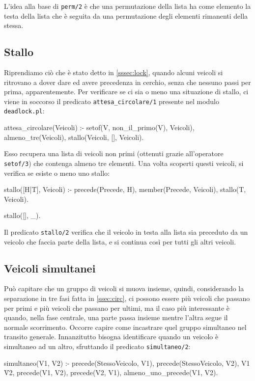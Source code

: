 L'idea alla base di \texttt{perm/2} è che una permutazione della lista ha come elemento la testa della lista che è seguita da una permutazione degli elementi rimanenti della stessa.

\subsection{Stallo}
Riprendiamo ciò che è stato detto in \ref{sssec:lock}, quando alcuni veicoli si ritrovano a dover dare ed avere precedenza in cerchio, senza che nessuno passi per prima, apparentemente. Per verificare se ci sia o meno una situazione di stallo, ci viene in soccorso il predicato \texttt{attesa\_circolare/1} presente nel modulo \texttt{deadlock.pl}:

\begin{verbatimtab}
attesa_circolare(Veicoli) :-
	setof(V, non_il_primo(V), Veicoli),
	almeno_tre(Veicoli),
	stallo(Veicoli, [], Veicoli).
\end{verbatimtab}

Esso recupera una lista di veicoli non primi (ottenuti grazie all'operatore \texttt{setof/3}) che contenga almeno tre elementi. Una volta scoperti questi veicoli, si verifica se esiste o meno uno stallo:
\begin{verbatimtab}
stallo([H|T], Veicoli) :-
	precede(Precede, H),
	member(Precede, Veicoli),
	stallo(T, Veicoli).

stallo([], _).
\end{verbatimtab}

Il predicato \texttt{stallo/2} verifica che il veicolo in testa alla lista sia preceduto da un veicolo che faccia parte della lista, e si continua così per tutti gli altri veicoli.

\subsection{Veicoli simultanei}
Può capitare che un gruppo di veicoli si muova insieme, quindi, considerando la separazione in tre fasi fatta in \ref{ssec:circ}, ci possono essere più veicoli che passano per primi e più veicoli che passano per ultimi, ma il caso più interessante è quando, nella fase centrale, una parte passa insieme mentre l'altra segue il normale scorrimento. Occorre capire come incastrare quel gruppo simultaneo nel transito generale. Innanzitutto bisogna identificare quando un veicolo è simultaneo ad un altro, sfruttando il predicato \texttt{simultaneo/2}:
\begin{verbatimtab}
simultaneo(V1, V2) :-
	precede(StessoVeicolo, V1),
	precede(StessoVeicolo, V2),
	V1 \= V2,
	\+ precede(V1, V2),
	\+ precede(V2, V1),
	almeno_uno_precede(V1, V2).
\end{verbatimtab}

